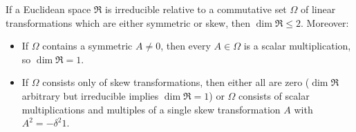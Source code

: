 If a Euclidean space $\mathfrak{R}$ is irreducible relative to a commutative set $\Omega$ of linear transformations which are either symmetric or skew, then $\dim \mathfrak{R} \leq 2$. Moreover:
\begin{itemize}
\item If $\Omega$ contains a symmetric $A \neq 0$, then every $A \in \Omega$ is a scalar multiplication, so $\dim \mathfrak{R} = 1$.
\item If $\Omega$ consists only of skew transformations, then either all are zero ($\dim \mathfrak{R}$ arbitrary but irreducible implies $\dim \mathfrak{R} = 1$) or $\Omega$ consists of scalar multiplications and multiples of a single skew transformation $A$ with $A^2 = -\delta^2 1$.
\end{itemize}
